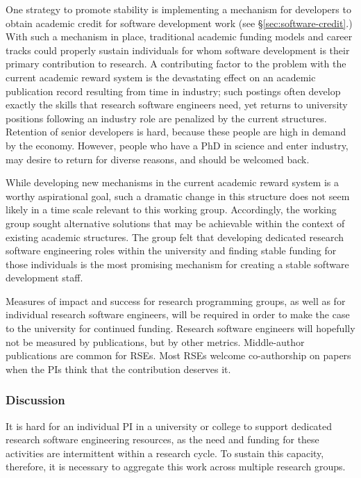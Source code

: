 One strategy to promote stability is implementing a mechanism for developers to
obtain academic credit for software development work (see \S\ref{sec:software-credit}.) With such a mechanism in
place, traditional academic funding models and career tracks could properly
sustain individuals for whom software development is their primary contribution
to research. A contributing factor to the problem with the current academic
reward system is the devastating effect on an academic publication record
resulting from time in industry; such postings often develop exactly the skills
that research software engineers need, yet returns to university positions
following an industry role are penalized by the current structures. Retention of
senior developers is hard, because these people are high in demand by the
economy. However, people who have a PhD in science and enter industry, may
desire to return for diverse reasons, and should be welcomed back.

While developing new mechanisms in the current academic reward system is a
worthy aspirational goal, such a dramatic change in this structure does not seem
likely in a time scale relevant to this working group. Accordingly, the working
group sought alternative solutions that may be achievable within the context of
existing academic structures. The group felt that developing dedicated research
software engineering roles within the university and finding stable funding for
those individuals is the most promising mechanism for creating a stable software
development staff.

Measures of impact and success for research programming groups, as well as for
individual research software engineers, will be required in order to make the
case to the university for continued funding. Research software engineers will
hopefully not be measured by publications, but by other metrics. Middle-author
publications are common for RSEs. Most RSEs welcome co-authorship on papers
when the PIs think that the contribution deserves it.

\subsubsection{Discussion}

It is hard for an individual PI in a university or college to support dedicated
research software engineering resources, as the need and funding for these
activities are intermittent within a research cycle. To sustain this capacity,
therefore, it is necessary to aggregate this work across multiple research
groups.

